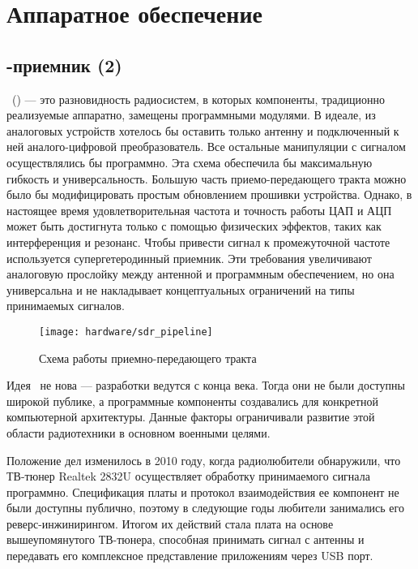 \section{Аппаратное обеспечение}
\label{sec:hardware}


\subsection{\SDR-приемник (2)}

\sdr\ (\SDR) --- это разновидность радиосистем, в которых компоненты, традиционно реализуемые аппаратно, замещены программными модулями.
В идеале, из аналоговых устройств хотелось бы оставить только антенну и подключенный к ней аналого-цифровой преобразователь. Все остальные манипуляции с сигналом осуществлялись бы программно. Эта схема обеспечила бы максимальную гибкость и универсальность. Большую часть приемо-передающего тракта можно было бы модифицировать простым обновлением прошивки устройства.
Однако, в настоящее время удовлетворительная частота и точность работы ЦАП и АЦП может быть достигнута только с помощью физических эффектов, таких как интерференция и резонанс. Чтобы привести сигнал к промежуточной частоте используется супергетеродинный приемник. Эти требования увеличивают аналоговую прослойку между антенной и программным обеспечением, но она универсальна и не накладывает концептуальных ограничений на типы принимаемых сигналов.

\begin{figure}[h]
  \centering
  \texttt{[image: hardware/sdr\_pipeline]}
  \caption{Схема работы приемно-передающего тракта \SDR\ \cite{sdr_wiki}}
  \label{fig:hardware:sdr_pipeline}
\end{figure}

Идея \SDR\ не нова --- разработки ведутся с конца  века. Тогда они не были доступны широкой публике, а программные компоненты создавались для конкретной компьютерной архитектуры. Данные факторы ограничивали развитие этой области радиотехники в основном военными целями.

Положение дел изменилось в 2010 году, когда радиолюбители обнаружили, что ТВ-тюнер Realtek 2832U осуществляет обработку принимаемого сигнала программно. Спецификация платы и протокол взаимодействия ее компонент не были доступны публично, поэтому в следующие годы любители занимались его реверс-инжинирингом. Итогом их действий стала плата на основе вышеупомянутого ТВ-тюнера, способная принимать сигнал с антенны и передавать его комплексное представление приложениям через USB порт.

